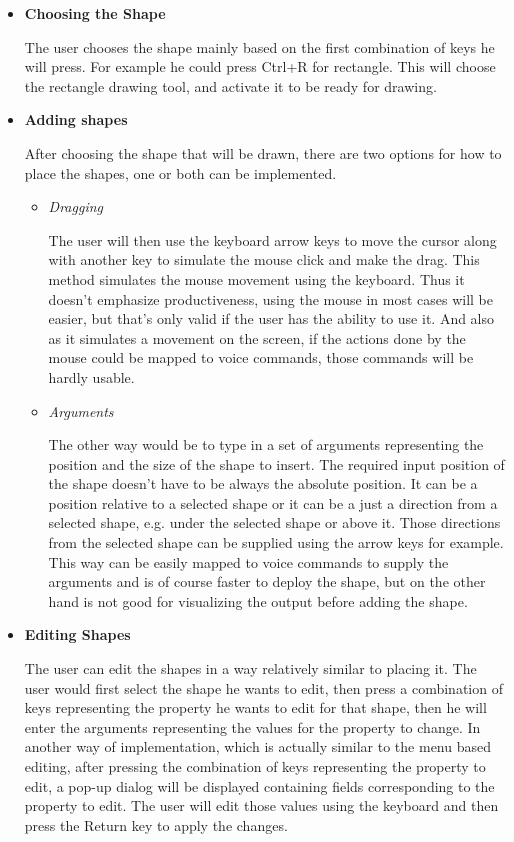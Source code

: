 \begin{itemize}
\item {\bf Choosing the Shape}
\par \noindent
The user chooses the shape mainly based on the first combination of keys he will press. For example he could press Ctrl+R for rectangle. This will choose the rectangle drawing tool, and activate it to be ready for drawing.

\item {\bf Adding shapes}
\par \noindent
After choosing the shape that will be drawn, there are two options for how to place the shapes, one or both can be implemented.
	\begin{itemize}
	\item {\it Dragging}
	\par \noindent
	The user will then use the keyboard arrow keys to move the cursor along with another key to simulate the mouse click and make the drag. This method simulates the mouse movement using the keyboard. Thus it doesn't emphasize productiveness, using the mouse in most cases will be easier, but that's only valid if the user has the ability to use it. And also as it simulates a movement on the screen, if the actions done by the mouse could be mapped to voice commands, those commands will be hardly usable.
	
	\item {\it Arguments}
	\par \noindent
	The other way would be to type in a set of arguments representing the position and the size of the shape to insert. The required input position of the shape doesn't have to be always the absolute position. It can be a position relative to a selected shape or it can be a just a direction from a selected shape, e.g. under the selected shape or above it. Those directions from the selected shape can be supplied using the arrow keys for example. This way can be easily mapped to voice commands to supply the arguments and is of course faster to deploy the shape, but on the other hand is not good for visualizing the output before adding the shape.
	\end{itemize}

\item {\bf Editing Shapes}
\par \noindent
	The user can edit the shapes in a way relatively similar to placing it. The user would first select the shape he wants to edit, then press a combination of keys representing the property he wants to edit for that shape, then he will enter the arguments representing the values for the property to change. In another way of implementation, which is actually similar to the menu based editing, after pressing the combination of keys representing the property to edit, a pop-up dialog will be displayed containing fields corresponding to the property to edit. The user will edit those values using the keyboard and then press the Return key to apply the changes.


\end{itemize}
